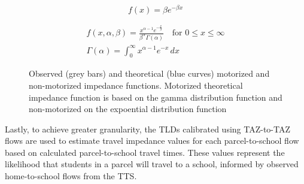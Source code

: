 \documentclass[
default
]{sn-jnl}
\begin{document}
\begin{equation}
\label{eq:exp-dist}
f(x) = \beta e ^{-\beta x}
\end{equation}

\begin{equation}
\label{eq:gamma-dist}
\begin{aligned}
f(x, \alpha, \beta) = \frac {x^{\alpha-1}e^{-\frac{x}{\beta}}}{ \beta^{\alpha}\Gamma(\alpha)} \quad \text{for } 0 \leq x \leq \infty \\
\Gamma(\alpha) =  \int_{0}^{\infty} x^{\alpha-1}e^{-x} \,dx
\end{aligned}
\end{equation}

\begin{figure}[H]


\caption{\label{fig-Fig5}Observed (grey bars) and theoretical (blue
curves) motorized and non-motorized impedance functions. Motorized
theoretical impedance function is based on the gamma distribution
function and non-motorized on the expoential distribution function}

\end{figure}%

Lastly, to achieve greater granularity, the TLDs calibrated using
TAZ-to-TAZ flows are used to estimate travel impedance values for each
parcel-to-school flow based on calculated parcel-to-school travel times.
These values represent the likelihood that students in a parcel will
travel to a school, informed by observed home-to-school flows from the
TTS.
\end{document}
